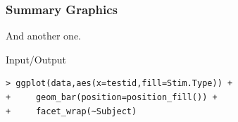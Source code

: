 \documentclass[xcolor={table},c]{beamer}
\begin{document}
\begin{frame}[fragile]\frametitle{Summary Graphics}
And another one.
\begin{exampleblock}{Input/Output}\tiny
\begin{verbatim}
> ggplot(data,aes(x=testid,fill=Stim.Type)) +
+     geom_bar(position=position_fill()) +
+     facet_wrap(~Subject)
\end{verbatim}
    \end{exampleblock}
\begin{center}
\end{center}
\end{frame}



\appendix
\flushlinkimages
\end{document}
